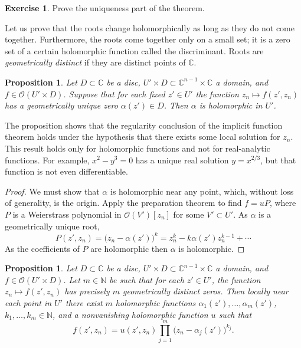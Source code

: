 \documentclass[12pt,openany]{book}
\newcommand{\C}{{\mathbb{C}}}
\newcommand{\N}{{\mathbb{N}}}
\newcommand{\sO}{{\mathscr{O}}}
\newcommand{\myindex}[1]{#1\index{#1}}
\theoremstyle{plain}
\newtheorem{prop}[thm]{Proposition}
\theoremstyle{remark}
\theoremstyle{definition}
\newenvironment{exbox}{%
    \def\FrameCommand{\vrule width 1pt \relax\hspace {10pt}}%
    \MakeFramed {\advance \hsize -\width \FrameRestore }%
}{%
    \endMakeFramed
}
\theoremstyle{exercise}
\newtheorem{exercise}{Exercise}[section]
\theoremstyle{example}
\begin{document}
\begin{exbox}
\begin{exercise}
Prove the uniqueness part of the theorem.
\end{exercise}
\end{exbox}

Let us prove that the roots change holomorphically as long as they do not
come together.  Furthermore, the roots come together
only on a small set; it is a zero set of a certain holomorphic function
called the discriminant.  Roots are
\emph{\myindex{geometrically distinct}} if they are distinct
points of $\C$.

\begin{prop} \label{prop:roothol}
Let $D \subset \C$ be a disc, 
$U' \times D \subset \C^{n-1} \times \C$ a domain,
and
$f \in \sO(U' \times D)$.
Suppose that for each fixed $z' \in U'$ the function
$z_n \mapsto f(z',z_n)$ has a geometrically unique zero $\alpha(z') \in D$.  Then $\alpha$ is
holomorphic in $U'$.
\end{prop}

The proposition shows that the regularity conclusion of the implicit
function theorem holds under the hypothesis that there exists some local
solution for $z_n$.  This result holds only for holomorphic
functions and not for real-analytic functions.  For example, $x^2-y^3 = 0$ has a
unique real solution $y = x^{2/3}$, but that function is not even
differentiable.

\begin{proof}
We must show that $\alpha$ 
is holomorphic near any point, which, without loss
of generality, is the origin.
Apply the preparation
theorem to find $f = u P$,
where $P$ is a
Weierstrass polynomial in $\sO(V')[z_n]$ for some $V' \subset U'$.
As $\alpha$ is a geometrically unique root,
\begin{equation*}
P(z',z_n) = {\bigl(z_n-\alpha(z') \bigr)}^k = z_n^k - k \alpha(z') z_n^{k-1}
+ \cdots
\end{equation*}
As the coefficients of $P$ are holomorphic then $\alpha$ is holomorphic.
\end{proof}

\begin{prop} \label{prop:rootshol}
Let $D \subset \C$ be a disc, 
$U' \times D \subset \C^{n-1} \times \C$ a domain,
and
$f \in \sO(U' \times D)$.
Let $m \in \N$ be such that
for each $z' \in U'$, the function $z_n \mapsto f(z',z_n)$ has
precisely $m$ geometrically distinct zeros.
Then locally near each point in $U'$ there exist $m$ holomorphic functions
$\alpha_1(z'),\ldots,\alpha_m(z')$,
$k_1,\ldots,k_m \in \N$,
and a nonvanishing holomorphic function $u$
such that
\begin{equation*}
f(z',z_n) = u(z',z_n) \prod_{j=1}^m {\bigl( z_n - \alpha_j(z') \bigr)}^{k_j}
.
\end{equation*}
\end{prop}
\end{document}
